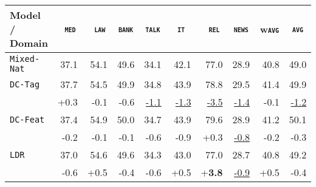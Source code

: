 \documentclass[11pt,a4paper]{article}
\newcommand{\domain}[1]{\texttt{\textsc{#1}}}
\newcommand{\system}[1]{\texttt{{#1}}}
\newcommand{\SB}[1]{\textbf{#1}}
\newcommand{\SW}[1]{\underline{#1}}
\begin{document}
\begin{table*}
  \centering
  \begin{tabular}{|p{2.5cm}|*{9}{r|}} \hline \footnotesize
    Model / Domain & \multicolumn{1}{c|}{\domain{ med}} & \multicolumn{1}{c|}{\domain{ law}} & \multicolumn{1}{c|}{\domain{bank}} & \multicolumn{1}{c|}{\domain{talk}} & \multicolumn{1}{c|}{\domain{ it }} & \multicolumn{1}{c|}{\domain{ rel}} & \multicolumn{1}{c|}{\domain{news}} & \multicolumn{1}{c|}{w\domain{avg}} & \multicolumn{1}{c|}{\domain{avg}} \\ \hline
     \system{Mixed-Nat}  & 37.1  & 54.1  & 49.6	& 34.1  & 42.1	& 77.0 & 28.9 & 40.8	& 49.0 \\ 
    \hline%
    \system{DC-Tag}      &  37.7 & 54.5   & 49.9    &  34.8 &  43.9  & 78.8 & 29.5  & 41.4 & 49.9\\[-2pt]
                   & \scriptsize +0.3  & \scriptsize -0.1   & \scriptsize -0.6    & \scriptsize \SW{-1.1}  &  \scriptsize \SW{-1.3}  & \scriptsize \SW{-3.5}  & \scriptsize \SW{-1.4}  & \scriptsize -0.1 & \scriptsize \SW{-1.2}\\
                   
	\system{DC-Feat}     & 37.4 & 54.9   & 50.0    & 34.7  &  43.9  & 79.6 & 28.9  & 41.2 & 50.1\\[-2pt]
                   & \scriptsize -0.2 & \scriptsize -0.1  & \scriptsize -0.1 & \scriptsize -0.6 & \scriptsize -0.9 & \scriptsize +0.3 & \scriptsize \SW{-0.8} & \scriptsize -0.2 & \scriptsize -0.3\\

    
    \system{LDR}    & 37.0   & 54.6  & 49.6    & 34.3  &  43.0  &77.0  & 28.7 & 40.8 & 49.2 \\[-2pt]
                    & \scriptsize -0.6 &	\scriptsize +0.5 & \scriptsize -0.4 & \scriptsize -0.6 &	\scriptsize +0.5 & \scriptsize +\SB{3.8} & \scriptsize \SW{-0.9} & \scriptsize +0.5 & \scriptsize -0.4 \\


\end{tabular}
\end{table*}
\end{document}
